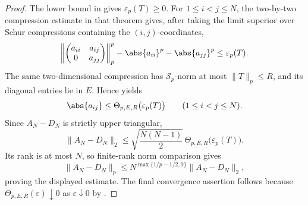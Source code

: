 \begin{proof}
  The lower bound in
   gives
  \(\varepsilon_p(T)\ge0\).  For \(1\le i<j\le N\), the two-by-two
  compression estimate in that theorem gives, after taking the limit superior
  over Schur compressions containing the \((i,j)\)-coordinates,
  \[
    \left\|
      \begin{pmatrix}a_{ii}&a_{ij}\\0&a_{jj}\end{pmatrix}
    \right\|_p^p
    -\abs{a_{ii}}^p-\abs{a_{jj}}^p
    \le \varepsilon_p(T).
  \]
  The same two-dimensional compression has \(\mathcal S_p\)-norm at most
  \(\|T\|_p\le R\), and its diagonal entries lie in \(E\).  Hence
   yields
  \[
    \abs{a_{ij}}
    \le
    \Theta_{p,E,R}\bigl(\varepsilon_p(T)\bigr)
    \qquad(1\le i<j\le N).
  \]
  Since \(A_N-D_N\) is strictly upper triangular,
  \[
    \|A_N-D_N\|_2
    \le
    \sqrt{\frac{N(N-1)}{2}}\,
    \Theta_{p,E,R}\bigl(\varepsilon_p(T)\bigr).
  \]
  Its rank is at most \(N\), so finite-rank norm comparison gives
  \[
    \|A_N-D_N\|_p
    \le
    N^{\max\{1/p-1/2,0\}}\|A_N-D_N\|_2,
  \]
  proving the displayed estimate.  The final convergence assertion follows
  because \(\Theta_{p,E,R}(\varepsilon)\downarrow0\) as
  \(\varepsilon\downarrow0\) by
  .
\end{proof}

